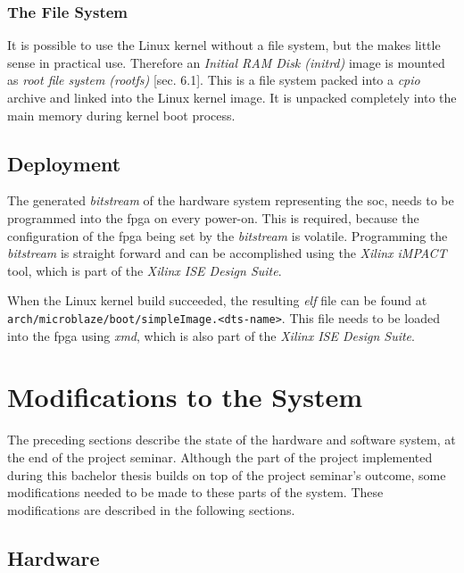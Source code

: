 \subsection{The File System}
\label{subsec:fs}

It is possible to use the Linux kernel without a file system, but the makes little sense in practical use. Therefore an \textit{Initial RAM Disk (initrd)} image is mounted as \textit{root file system (rootfs)} \cite{linuxPrimer}[sec. 6.1]. This is a file system packed into a \textit{cpio} archive and linked into the Linux kernel image. It is unpacked completely into the main memory during kernel boot process.
\\

\section{Deployment}

The generated \textit{bitstream} of the hardware system representing the \gls{soc}, needs to be programmed into the \gls{fpga} on every power-on. This is required, because the configuration of the \gls{fpga} being set by the \textit{bitstream} is volatile. Programming the \textit{bitstream} is straight forward and can be accomplished using the \textit{Xilinx iMPACT} tool, which is part of the \textit{Xilinx ISE Design Suite}.

When the Linux kernel build succeeded, the resulting \textit{\gls{elf}} file can be found at \texttt{arch/microblaze/boot/simpleImage.<dts-name>}. This file needs to be loaded into the \gls{fpga} using \textit{\gls{xmd}}, which is also part of the \textit{Xilinx ISE Design Suite}.

\chapter{Modifications to the System}

The preceding sections describe the state of the hardware and software system, at the end of the project seminar. Although the part of the project implemented during this bachelor thesis builds on top of the project seminar's outcome, some modifications needed to be made to these parts of the system. These modifications are described in the following sections.
\\

\section{Hardware}

